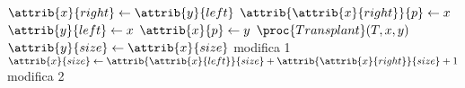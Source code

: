 \begin{codebox}
\li $\attrib{x}{right} \gets \attrib{y}{left}$
\li $\attrib{\attrib{x}{right}}{p} \gets x$
\li $\attrib{y}{left} \gets x$
\li $\attrib{x}{p} \gets y$
\li $\proc{Transplant}(T,x,y)$
\li $\attrib{y}{size} \gets \attrib{x}{size}$
	\Comment modifica 1
\li $\attrib{x}{size} \gets \attrib{\attrib{x}{left}}{size} + \attrib{\attrib{x}{right}}{size} + 1$
	\Comment modifica 2
\end{codebox}